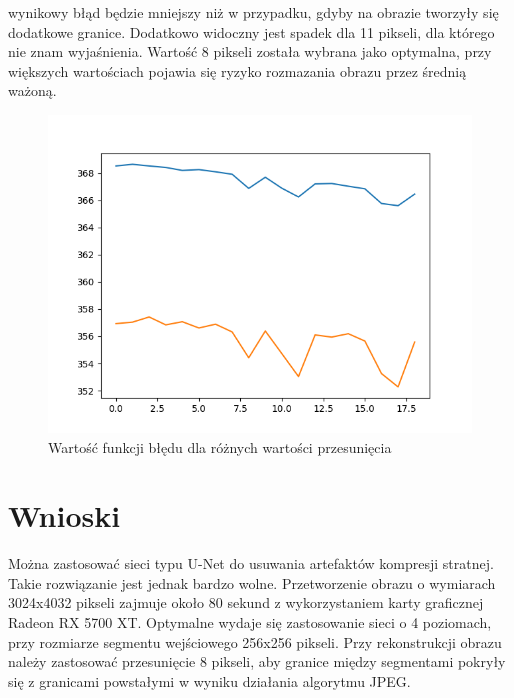 \documentclass[a4paper, 12pt]{article}
\begin{document}
wynikowy błąd będzie mniejszy niż w przypadku, gdyby na obrazie tworzyły się dodatkowe granice.
Dodatkowo widoczny jest spadek dla 11 pikseli, dla którego nie znam wyjaśnienia.
Wartość 8 pikseli została wybrana jako optymalna, przy większych wartościach pojawia się ryzyko rozmazania obrazu przez średnią ważoną.
\begin{figure}[h!]
\begin{center}
	\includegraphics[width=0.7\columnwidth]{overlap_and_loss.png}
	\caption{Wartość funkcji błędu dla różnych wartości przesunięcia}
	\label{fig:overlap_and_loss}
\end{center}
\end{figure}
\section{Wnioski}
Można zastosować sieci typu U-Net do usuwania artefaktów kompresji stratnej.
Takie rozwiązanie jest jednak bardzo wolne. Przetworzenie obrazu o wymiarach 3024x4032 pikseli zajmuje około 80 sekund z wykorzystaniem karty graficznej Radeon RX 5700 XT.
Optymalne wydaje się zastosowanie sieci o 4 poziomach, przy rozmiarze segmentu wejściowego 256x256 pikseli.
Przy rekonstrukcji obrazu należy zastosować przesunięcie 8 pikseli,
aby granice między segmentami pokryły się z granicami powstałymi w wyniku działania algorytmu JPEG.



\end{document}
